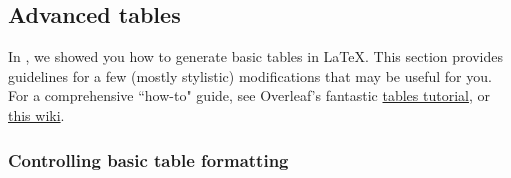 \documentclass[output=paper,colorlinks,citecolor=brown]{langscibook}
\begin{document}
\subsection{Advanced tables}\label{sec:diercks:AdvTabs}
In , we showed you how to generate basic tables in \LaTeX{}. This section provides guidelines for a few (mostly stylistic) modifications that may be useful for you. For a comprehensive ``how-to" guide, see Overleaf's fantastic \href{https://www.overleaf.com/learn/latex/Tables}{tables tutorial}, or \href{https://en.wikibooks.org/wiki/LaTeX/Tables}{this wiki}. 

\subsubsection{Controlling basic table formatting}

\end{document}
